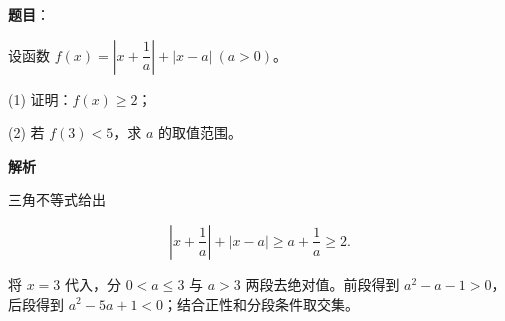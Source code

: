 \begin{answer}

\textbf{题目}：

设函数 $f(x)=\left|x+\dfrac1a\right|+|x-a|\ (a>0)$。

(1) 证明：$f(x)\geqslant2$；

(2) 若 $f(3)<5$，求 $a$ 的取值范围。

\textbf{解析}


三角不等式给出

\nopagebreak[4]
\[
\left|x+\frac1a\right|+|x-a|\geqslant a+\frac1a\geqslant2.
\]


将 $x=3$ 代入，分 $0<a\leqslant3$ 与 $a>3$ 两段去绝对值。前段得到 $a^2-a-1>0$，后段得到 $a^2-5a+1<0$；结合正性和分段条件取交集。



\end{answer}